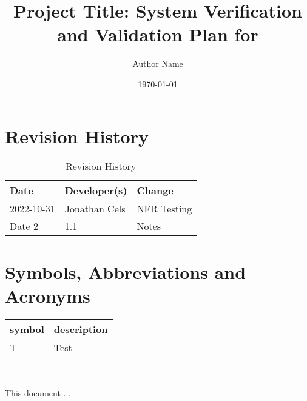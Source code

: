 \documentclass[12pt, titlepage]{article}
\begin{document}
\title{Project Title: System Verification and Validation Plan for \progname{}} 
\author{Author Name}
\date{\today}
	
\maketitle


\section{Revision History}

\begin{table}[hp]
\caption{Revision History} \label{TblRevisionHistory}
\begin{tabularx}{\textwidth}{llX}
\toprule
\textbf{Date} & \textbf{Developer(s)} & \textbf{Change}\\
\midrule
2022-10-31 & Jonathan Cels & NFR Testing\\
Date 2 & 1.1 & Notes\\
\bottomrule
\end{tabularx}
\end{table}

\newpage

\tableofcontents

\listoftables
{}

\listoffigures
{}

\newpage

\section{Symbols, Abbreviations and Acronyms}

\renewcommand{\arraystretch}{1.2}
\begin{tabular}{l l} 
  \toprule		
  \textbf{symbol} & \textbf{description}\\
  \midrule 
  T & Test\\
  \bottomrule
\end{tabular}\\


\newpage


This document ... 
\end{document}
